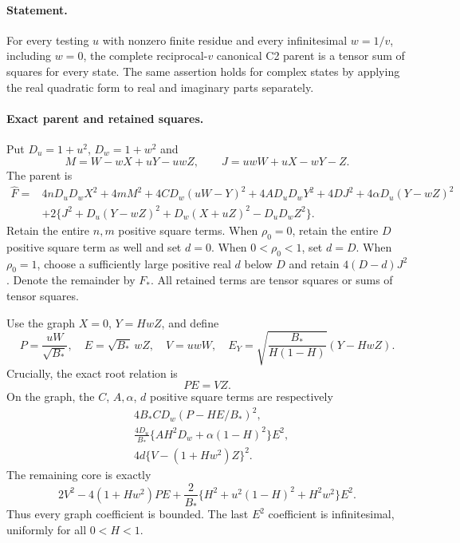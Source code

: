 \paragraph{Statement.}
For every testing $u$ with nonzero finite residue and every infinitesimal
$w=1/v$, including $w=0$, the complete reciprocal-$v$ canonical C2 parent
is a tensor sum of squares for every state.  The same assertion holds for
complex states by applying the real quadratic form to real and imaginary
parts separately.

\paragraph{Exact parent and retained squares.}
Put $D_u=1+u^2$, $D_w=1+w^2$ and
\[
 M=W-wX+uY-uwZ,\qquad J=uwW+uX-wY-Z.
\]
The parent is
\begin{align*}
\widehat F={}&4nD_uD_wX^2+4mM^2+4CD_w(uW-Y)^2
 +4AD_uD_wY^2+4DJ^2+4\alpha D_u(Y-wZ)^2\\
&+2\{J^2+D_u(Y-wZ)^2+D_w(X+uZ)^2-D_uD_wZ^2\}.
\end{align*}
Retain the entire $n,m$ positive square terms. When $\rho_0=0$, retain the entire
$D$ positive square term as well and set $d=0$. When $0<\rho_0<1$, set $d=D$.
When $\rho_0=1$, choose a sufficiently large positive real $d$ below $D$
and retain $4(D-d)J^2$.  Denote the remainder by $F_*$.  All retained
terms are tensor squares or sums of tensor squares.

Use the graph $X=0$, $Y=HwZ$, and define
\[
 P=\frac{uW}{\sqrt{B_*}},\quad E=\sqrt{B_*}\,wZ,
 \quad V=uwW,\quad
 E_Y=\sqrt{\frac{B_*}{H(1-H)}}(Y-HwZ).
\tag{OA3}
\]
Crucially, the exact root relation is
\[
 PE=VZ.\tag{OA4}
\]
On the graph, the $C$, $A,\alpha$, $d$ positive square terms are respectively
\begin{align*}
 &4B_*CD_w(P-HE/B_*)^2,\\
 &\frac{4D_u}{B_*}\{AH^2D_w+\alpha(1-H)^2\}E^2,\\
 &4d\{V-(1+Hw^2)Z\}^2.
\end{align*}
The remaining core is exactly
\[
 2V^2-4(1+Hw^2)PE
 +\frac{2}{B_*}\{H^2+u^2(1-H)^2+H^2w^2\}E^2.
\tag{OA5}
\]
Thus every graph coefficient is bounded.  The last $E^2$ coefficient is
infinitesimal, uniformly for all $0<H<1$.

